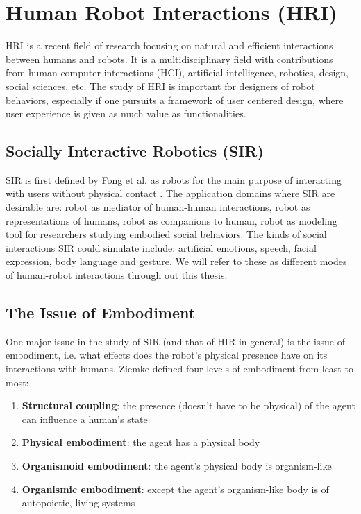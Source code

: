 \section{Human Robot Interactions (HRI)}

HRI is a recent field of research focusing on natural and efficient interactions between humans and robots.  It is a multidisciplinary field with contributions from human computer interactions (HCI), artificial intelligence, robotics, design, social sciences, etc.  The study of HRI is important for designers of robot behaviors, especially if one pursuits a framework of user centered design, where user experience is given as much value as functionalities. 


\subsection{Socially Interactive Robotics (SIR)}
SIR is first defined by Fong et al. as robots for the main purpose of interacting with users without physical contact \cite{fong2003survey}.  The application domains where SIR are desirable are: robot as mediator of human-human interactions, robot as representations of humans, robot as companions to human, robot as modeling tool for researchers studying embodied social behaviors.  The kinds of social interactions SIR could simulate include: artificial emotions, speech, facial expression, body language and gesture.  We will refer to these as different modes of human-robot interactions through out this thesis.


\subsection{The Issue of Embodiment}
One major issue in the study of SIR (and that of HIR in general) is the issue of embodiment, i.e. what effects does the robot's physical presence have on its interactions with humans.  Ziemke \cite{ziemke2001disentangling} defined four levels of embodiment from least to most:
\begin{enumerate}
	\item \textbf{Structural coupling}: the presence (doesn't have to be physical) of the agent can influence a human's state
	\item \textbf{Physical embodiment}: the agent has a physical body
	\item \textbf{Organismoid embodiment}: the agent's physical body is organism-like
	\item \textbf{Organismic embodiment}: except the agent's organism-like body is of autopoietic, living systems
\end{enumerate}


